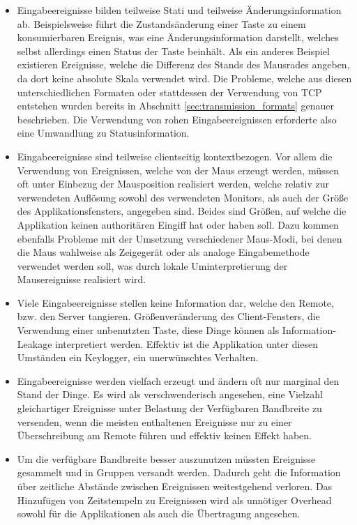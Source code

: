 \begin{itemize}
\item Eingabeereignisse bilden teilweise Stati und teilweise Änderungsinformation ab. Beispielsweise führt die Zustandsänderung einer Taste zu einem konsumierbaren Ereignis, was eine Änderungsinformation darstellt, welches selbst allerdings einen Status der Taste beinhält. Als ein anderes Beispiel existieren Ereignisse, welche die Differenz des Stands des Mausrades angeben, da dort keine absolute Skala verwendet wird. Die Probleme, welche aus diesen unterschiedlichen Formaten oder stattdessen der Verwendung von TCP entstehen wurden bereits in Abschnitt \ref{sec:transmission_formats} genauer beschrieben. Die Verwendung von rohen Eingabeereignissen erforderte also eine Umwandlung zu Statusinformation.
\item Eingabeereignisse sind teilweise clientseitig kontextbezogen. Vor allem die Verwendung von Ereignissen, welche von der Maus erzeugt werden, müssen oft unter Einbezug der Mausposition realisiert werden,
welche relativ zur verwendeten Auflösung sowohl des verwendeten Monitors, als auch der Größe des Applikationsfensters, angegeben sind. Beides sind Größen, auf welche die Applikation keinen authoritären Eingiff hat oder haben soll. Dazu kommen ebenfalls Probleme mit der Umsetzung verschiedener Maus-Modi, bei denen die Maus wahlweise als Zeigegerät oder als analoge Eingabemethode verwendet werden soll, was durch lokale Uminterpretierung der Mausereignisse realisiert wird.
\item Viele Eingabeereignisse stellen keine Information dar, welche den Remote, bzw. den Server tangieren. Größenveränderung des Client-Fensters, die Verwendung einer unbenutzten Taste, diese Dinge können als Information-Leakage interpretiert werden. Effektiv ist die Applikation unter diesen Umständen ein Keylogger, ein unerwünschtes Verhalten.
\item Eingabeereignisse werden vielfach erzeugt und ändern oft nur marginal den Stand der Dinge. Es wird als verschwenderisch angesehen, eine Vielzahl gleichartiger Ereignisse unter Belastung der Verfügbaren Bandbreite zu versenden, wenn die meisten enthaltenen Ereignisse nur zu einer Überschreibung am Remote führen und effektiv keinen Effekt haben.
\item Um die verfügbare Bandbreite besser auszunutzen müssten Ereignisse gesammelt und in Gruppen versandt werden. Dadurch geht die Information über zeitliche Abstände zwischen Ereignissen weitestgehend verloren. Das Hinzufügen von Zeitstempeln zu Ereignissen wird als unnötiger Overhead sowohl für die Applikationen als auch die Übertragung angesehen.
\end{itemize}
